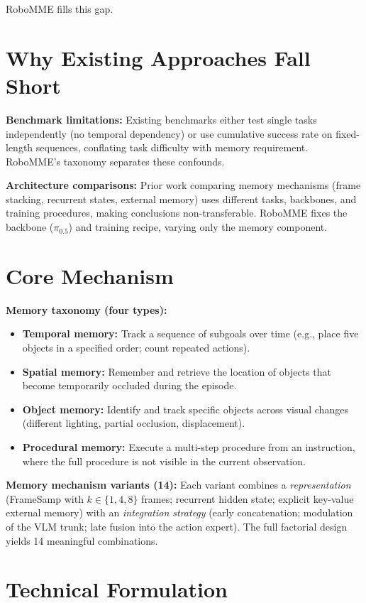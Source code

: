 \documentclass[10pt,twocolumn]{article}
\begin{document}
RoboMME fills this gap.

\section{Why Existing Approaches Fall Short}

\textbf{Benchmark limitations:} Existing benchmarks either test single
tasks independently (no temporal dependency) or use cumulative success rate
on fixed-length sequences, conflating task difficulty with memory requirement.
RoboMME's taxonomy separates these confounds.

\textbf{Architecture comparisons:} Prior work comparing memory mechanisms
(frame stacking, recurrent states, external memory) uses different tasks,
backbones, and training procedures, making conclusions non-transferable.
RoboMME fixes the backbone ($\pi_{0.5}$) and training recipe, varying only
the memory component.

\section{Core Mechanism}

\textbf{Memory taxonomy (four types):}
\begin{itemize}[itemsep=2pt,parsep=0pt]
  \item \textbf{Temporal memory:} Track a sequence of subgoals over time
    (e.g., place five objects in a specified order; count repeated actions).
  \item \textbf{Spatial memory:} Remember and retrieve the location of objects
    that become temporarily occluded during the episode.
  \item \textbf{Object memory:} Identify and track specific objects across
    visual changes (different lighting, partial occlusion, displacement).
  \item \textbf{Procedural memory:} Execute a multi-step procedure from
    an instruction, where the full procedure is not visible in the
    current observation.
\end{itemize}

\textbf{Memory mechanism variants (14):} Each variant combines a
\emph{representation} (FrameSamp with $k \in \{1,4,8\}$ frames; recurrent
hidden state; explicit key-value external memory) with an \emph{integration
strategy} (early concatenation; modulation of the VLM trunk; late fusion into
the action expert). The full factorial design yields 14 meaningful combinations.

\section{Technical Formulation}
\end{document}
